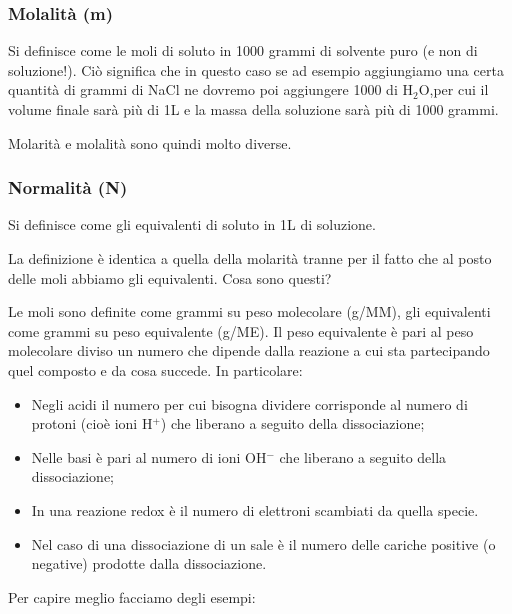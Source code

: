 \subsubsection{Molalità (m)}
Si definisce come le moli di soluto in 1000 grammi di solvente puro (e non di soluzione!). Ciò significa che in questo caso se ad esempio aggiungiamo una certa quantità di grammi di NaCl ne dovremo poi aggiungere 1000 di H$_2$O,per cui il volume finale sarà più di 1L e la massa della soluzione sarà più di 1000 grammi.

Molarità e molalità sono quindi molto diverse.
\subsubsection{Normalità (N)}
Si definisce come gli equivalenti di soluto in 1L di soluzione.

La definizione è identica a quella della molarità tranne per il fatto che al posto delle moli abbiamo gli equivalenti. Cosa sono questi?

Le moli sono definite come grammi su peso molecolare (g/MM), gli equivalenti come grammi su peso equivalente (g/ME). Il peso equivalente è pari al peso molecolare diviso un numero che dipende dalla reazione a cui sta partecipando quel composto e da cosa succede. In particolare:
\begin{itemize}
    \item Negli acidi il numero per cui bisogna dividere corrisponde al numero di protoni (cioè ioni H$^+$) che liberano a seguito della dissociazione;
    \item Nelle basi è pari al numero di ioni OH$^-$ che liberano a seguito della dissociazione;
    \item In una reazione redox è il numero di elettroni scambiati da quella specie.
    \item Nel caso di una dissociazione di un sale è il numero delle cariche positive (o negative) prodotte dalla dissociazione.
\end{itemize}

Per capire meglio facciamo degli esempi:

